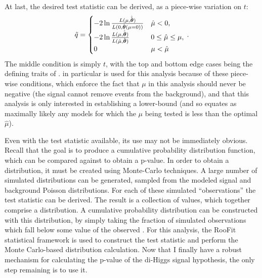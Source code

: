     At last, the desired test statistic \qtil can be derived, as a piece-wise variation on $t$\cite{asymptotic_formulae_for_likelihood}:
    \begin{equation}
        \tilde{q} = \begin{cases}
            -2 \ln{\frac{L(\mu, \hat {\hat {\boldsymbol{\theta}}})}{L(0, \hat {\boldsymbol{\theta}}(\mu=0))}} & \hat \mu < 0,\\
            -2 \ln{\frac{L(\mu, \hat {\hat {\boldsymbol{\theta}}})}{L(\hat \mu, \hat {\boldsymbol{\theta}})}} & 0 \leq \hat \mu \leq \mu,\\
            0 & \mu < \hat \mu 
        \end{cases}
        \,.
    \end{equation}
    The middle condition is simply $t$, with the top and bottom edge cases being the defining traits of \qtil.
    \qtil in particular is used for this analysis because of these piece-wise conditions,
        which enforce the fact that $\mu$ in this analysis should never be negative
        (the signal cannot remove events from the background),
        and that this analysis is only interested in establishing a lower-bound
        (and so equates as maximally likely any models for which the $\mu$ being tested is less than the optimal $\hat\mu$).

    Even with the test statistic \qtil available, its use may not be immediately obvious.
    Recall that the goal is to produce a cumulative probability distribution function,
        which can be compared against to obtain a p-value.
    In order to obtain a distribution, it must be created using Monte-Carlo techniques.
    A large number of simulated distributions can be generated,
        sampled from the modeled signal and background Poisson distributions.
    For each of these simulated ``observations'' the test statistic \qtil can be derived.
    The result is a collection of \qtil values, which together comprise a distribution.
    A cumulative probability distribution can be constructed with this distribution,
        by simply taking the fraction of simulated observations which fall below some value of the observed \qtil.
    For this analysis, the RooFit statistical framework\cite{RooFit} is used to construct the test statistic and perform the
        Monte Carlo-based distribution calculation.
    Now that I finally have a robust mechanism for calculating the p-value of the di-Higgs signal hypothesis,
        the only step remaining is to use it.

